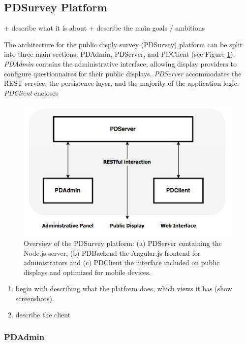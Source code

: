 

\subsection{PDSurvey Platform}

	+ describe what it is about + describe the main goals / ambitions

	The architecture for the public disply survey (PDSurvey) platform can be split into three main sections: PDAdmin, PDServer, and PDClient (see Figure \ref{fig:4-pdsurvey-platform}). \textit{PDAdmin} contains the administrative interface, allowing display providers to configure questionnaires for their public displays. \textit{PDServer} accommodates the REST service, the persistence layer, and the majority of the application logic. \textit{PDClient} encloses 

	\begin{figure}%
	    \begin{center}
	        \includegraphics[width=.7\columnwidth]{img/4_implementation/4-overview}
	    \end{center}
	 \caption[Overview of the PDSurvey platform]{Overview of the PDSurvey platform: (a) PDServer containing the Node.js server, (b) PDBackend the Angular.js frontend for administrators and (c) PDClient the interface included on public displays and optimized for mobile devices.}
	 \label{fig:4-pdsurvey-platform}
	\end{figure}



	\begin{enumerate}
	\item begin with describing what the platform does, which views it has (show screenshots).
	\item describe the client
	\end{enumerate}



	\subsubsection{PDAdmin}

